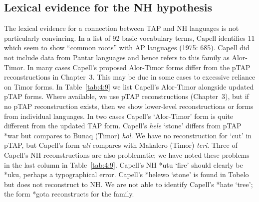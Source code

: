 \subsection{Lexical evidence for the NH hypothesis}\largerpage
The lexical evidence for a connection between TAP and NH languages is not particularly convincing. In a list of 92 basic vocabulary terms, Capell identifies 11 which seem to show ``common roots'' with AP languages (1975: 685). Capell did not include data from Pantar languages and hence refers to this family as Alor-Timor. In many cases Capell's proposed Alor-Timor forms differ from the pTAP reconstructions in Chapter~3. This may be due in some cases to excessive reliance on Timor forms. In Table~\ref{tab:4:9} we list Capell's Alor-Timor alongside updated pTAP forms. Where available, we use pTAP reconstructions (Chapter~3), but if no pTAP reconstruction exists, then we show lower-level reconstructions or forms from individual languages. In two cases Capell's `Alor-Timor' form is quite different from the updated TAP form. Capell's \textit{hele} `stone' differs from pTAP *war but compares to Bunaq (Timor) \textit{hol. }We have no reconstruction for `cut' in pTAP, but Capell's form \textit{uti }compares with Makalero (Timor)
 \textit{teri}. Three of Capell's NH reconstructions are also problematic; we have noted these problems in the last column in Table~\ref{tab:4:9}. Capell's NH *utu `fire' should clearly be *uku, perhaps a typographical error. Capell's *helewo `stone' is found in Tobelo but does not reconstruct to NH. We are not able to identify Capell's *hate `tree'; the form *gota reconstructs for the family.




